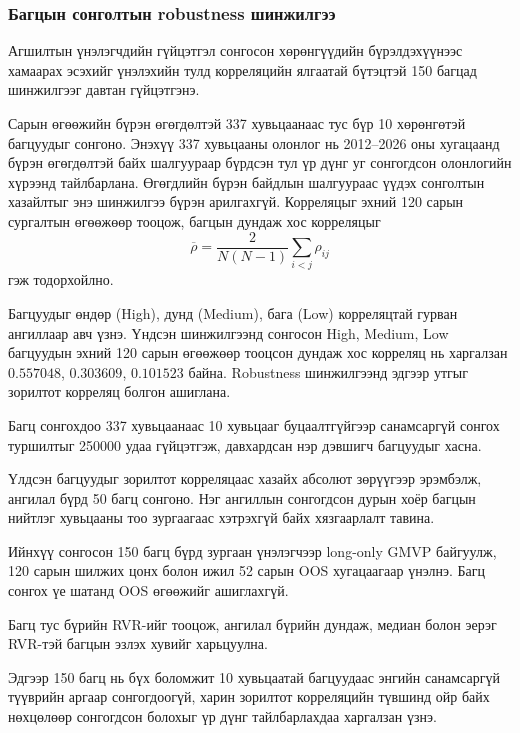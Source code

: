 
\subsubsection{Багцын сонголтын
	robustness шинжилгээ}
\label{subsubsec:portfolio_robustness}

Агшилтын үнэлэгчдийн гүйцэтгэл
сонгосон хөрөнгүүдийн бүрэлдэхүүнээс
хамаарах эсэхийг үнэлэхийн тулд
корреляцийн ялгаатай бүтэцтэй
150 багцад шинжилгээг давтан
гүйцэтгэнэ.

Сарын өгөөжийн бүрэн өгөгдөлтэй
337 хувьцаанаас тус бүр 10 хөрөнгөтэй
багцуудыг сонгоно. Энэхүү 337 хувьцааны олонлог нь
2012--2026 оны хугацаанд бүрэн өгөгдөлтэй байх
шалгуураар бүрдсэн тул үр дүнг уг сонгогдсон
олонлогийн хүрээнд тайлбарлана. Өгөгдлийн бүрэн
байдлын шалгуураас үүдэх сонголтын хазайлтыг
энэ шинжилгээ бүрэн арилгахгүй. Корреляцыг
эхний 120 сарын сургалтын өгөөжөөр
тооцож, багцын дундаж хос
корреляцыг
\[
\overline{\rho}
=
\frac{2}{N(N-1)}
\sum_{i<j}\rho_{ij}
\]
гэж тодорхойлно.

Багцуудыг өндөр (High),
дунд (Medium), бага (Low)
корреляцтай гурван ангиллаар
авч үзнэ. Үндсэн шинжилгээнд сонгосон High, Medium,
Low багцуудын эхний 120 сарын өгөөжөөр
тооцсон дундаж хос корреляц нь харгалзан
$0.557048$, $0.303609$, $0.101523$ байна.
Robustness шинжилгээнд эдгээр утгыг
зорилтот корреляц болгон ашиглана.

Багц сонгохдоо 337 хувьцаанаас
10 хувьцааг буцаалтгүйгээр
санамсаргүй сонгох туршилтыг
250000 удаа гүйцэтгэж,
давхардсан нэр дэвшигч
багцуудыг хасна.

Үлдсэн багцуудыг зорилтот
корреляцаас хазайх абсолют
зөрүүгээр эрэмбэлж, ангилал
бүрд 50 багц сонгоно.
Нэг ангиллын сонгогдсон
дурын хоёр багцын нийтлэг
хувьцааны тоо зургаагаас
хэтрэхгүй байх хязгаарлалт
тавина.

Ийнхүү сонгосон 150 багц бүрд
зургаан үнэлэгчээр long-only
GMVP байгуулж, 120 сарын
шилжих цонх болон ижил
52 сарын OOS хугацаагаар
үнэлнэ. Багц сонгох үе шатанд
OOS өгөөжийг ашиглахгүй.

Багц тус бүрийн RVR-ийг тооцож,
ангилал бүрийн дундаж, медиан
болон эерэг RVR-тэй багцын
эзлэх хувийг харьцуулна.

Эдгээр 150 багц нь бүх боломжит
10 хувьцаатай багцуудаас энгийн
санамсаргүй түүврийн аргаар
сонгогдоогүй, харин зорилтот
корреляцийн түвшинд ойр байх
нөхцөлөөр сонгогдсон болохыг
үр дүнг тайлбарлахдаа харгалзан үзнэ.

